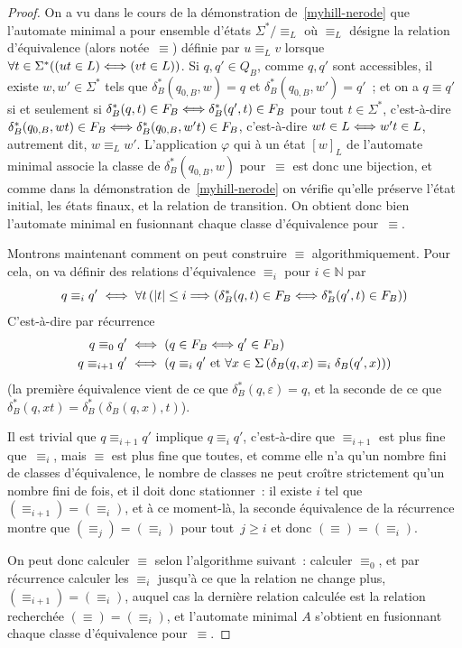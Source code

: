\documentclass[12pt,a4paper]{article}
\theoremstyle{definition}
\newcommand{\limp}{\mathrel{\Longrightarrow}\relax}
\newcommand{\liff}{\mathrel{\Longleftrightarrow}\relax}
\begin{document}
\begin{proof}
On a vu dans le cours de la démonstration de \ref{myhill-nerode} que
l'automate minimal a pour ensemble d'états $\Sigma^*/{\equiv_L}$ où
$\equiv_L$ désigne la relation d'équivalence (alors notée $\equiv$)
définie par $u \mathrel{\equiv_L} v$ lorsque $\forall t\in \Sigma^*
((ut\in L) \liff (vt \in L))$.  Si $q,q' \in Q_B$, comme $q,q'$ sont
accessibles, il existe $w,w'\in\Sigma^*$ tels que
$\delta_B^*(q_{0,B},w) = q$ et $\delta_B^*(q_{0,B},w') = q'$ ; et on a
$q \equiv q'$ si et seulement si $\delta^*_B(q,t)\in F_B \liff
\delta^*_B(q',t)\in F_B$ pour tout $t\in\Sigma^*$, c'est-à-dire
$\delta^*_B(q_{0,B},wt)\in F_B \liff \delta^*_B(q_{0,B},w't)\in F_B$,
c'est-à-dire $wt\in L \liff w't\in L$, autrement dit, $w
\mathrel{\equiv_L} w'$.  L'application $\varphi$ qui à un état $[w]_L$
de l'automate minimal associe la classe de $\delta_B^*(q_{0,B},w)$
pour $\equiv$ est donc une bijection, et comme dans la démonstration
de \ref{myhill-nerode} on vérifie qu'elle préserve l'état initial, les
états finaux, et la relation de transition.  On obtient donc bien
l'automate minimal en fusionnant chaque classe d'équivalence
pour $\equiv$.

Montrons maintenant comment on peut construire $\equiv$
algorithmiquement.  Pour cela, on va définir des relations
d'équivalence $\equiv_i$ pour $i\in\mathbb{N}$ par
\[
q \mathrel{\equiv_i} q' \;\liff\; \forall t\, (|t|\leq i \limp (\delta^*_B(q,t)\in F_B \liff \delta^*_B(q',t)\in F_B))
\]
C'est-à-dire par récurrence
\[
\begin{aligned}
q \mathrel{\equiv_0} q' \;&\liff\; (q\in F_B \liff q'\in F_B)\\
q \mathrel{\equiv_{i+1}} q' \;&\liff\; (q\mathrel{\equiv_{i}}q' \hbox{~et~} \forall x\in\Sigma\,(\delta_B(q,x) \mathrel{\equiv_i} \delta_B(q',x)))\\
\end{aligned}
\]
(la première équivalence vient de ce que $\delta^*_B(q,\varepsilon) =
q$, et la seconde de ce que $\delta^*_B(q,xt) =
\delta^*_B(\delta_B(q,x), t)$).

Il est trivial que $q \mathrel{\equiv_{i+1}} q'$ implique $q
\mathrel{\equiv_i} q'$, c'est-à-dire que $\equiv_{i+1}$ est plus fine
que $\equiv_i$, mais $\equiv$ est plus fine que toutes, et comme elle
n'a qu'un nombre fini de classes d'équivalence, le nombre de classes
ne peut croître strictement qu'un nombre fini de fois, et il doit donc
stationner : il existe $i$ tel que $({\equiv_{i+1}}) = ({\equiv_i})$,
et à ce moment-là, la seconde équivalence de la récurrence montre que
$({\equiv_j}) = ({\equiv_i})$ pour tout $j\geq i$ et donc $(\equiv) =
({\equiv_i})$.

On peut donc calculer $\equiv$ selon l'algorithme suivant : calculer
$\equiv_0$, et par récurrence calculer les $\equiv_i$ jusqu'à ce que
la relation ne change plus, $({\equiv_{i+1}}) = ({\equiv_i})$, auquel
cas la dernière relation calculée est la relation recherchée $(\equiv)
= ({\equiv_i})$, et l'automate minimal $A$ s'obtient en fusionnant
chaque classe d'équivalence pour $\equiv$.
\end{proof}
\end{document}
